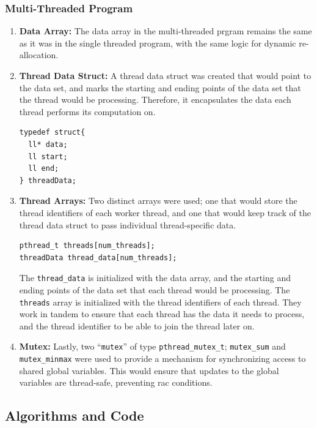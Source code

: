 \documentclass{article}
\theoremstyle{mytheoremstyle}
\theoremstyle{mytheoremstyle}
\theoremstyle{myproblemstyle}
\begin{document}
\subsubsection*{Multi-Threaded Program}
\begin{enumerate}
  \item \textbf{Data Array:} The data array in the multi-threaded prgram remains the same as it was in the single threaded program, with the same logic for dynamic re-allocation.
  \item \textbf{Thread Data Struct:} A thread data struct was created that would point to the data set, and marks the starting and ending points of the data set that the thread would be processing. Therefore, it encapsulates the data each thread performs its computation on.
        \begin{lstlisting}[caption={Thread Data Struct}]
typedef struct{
  ll* data;
  ll start;
  ll end;
} threadData;\end{lstlisting}

  \item \textbf{Thread Arrays:} Two distinct arrays were used; one that would store the thread identifiers of each worker thread, and one that would keep track of the thread data struct to pass individual thread-specific data.
        \begin{lstlisting}[caption={Thread Arrays}]
pthread_t threads[num_threads];
threadData thread_data[num_threads];
\end{lstlisting}
        The \texttt{thread\_data} is initialized with the data array, and the starting and ending points of the data set that each thread would be processing. The \texttt{threads} array is initialized with the thread identifiers of each thread. They work in tandem to ensure that each thread has the data it needs to process, and the thread identifier to be able to join the thread later on.

  \item \textbf{Mutex:} Lastly, two ``\texttt{mutex}'' of type \texttt{pthread\_mutex\_t}; \texttt{mutex\_sum} and \texttt{mutex\_minmax} were used to provide a mechanism for synchronizing access to shared global variables. This would ensure that updates to the global variables are thread-safe, preventing rac conditions.
\end{enumerate}
\subsection{Algorithms and Code}
\end{document}
